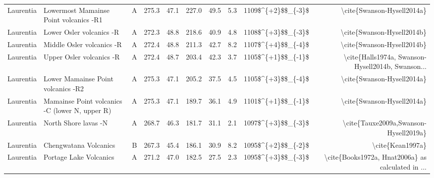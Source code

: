 \begin{longtable}{p{1 in}p{1 in}rrrrrrrr}
                     Laurentia &           Lowermost Mamainse Point volcanics -R1 &      A &     275.3 &      47.1 & 227.0 &  49.5 &       5.3 &     1109\$\textasciicircum \{+2\}\$\$\_\{-3\}\$ &                         \textbackslash cite\{Swanson-Hysell2014a\} \\
                     Laurentia &                         Lower Osler volcanics -R &      A &     272.3 &      48.8 & 218.6 &  40.9 &       4.8 &     1108\$\textasciicircum \{+3\}\$\$\_\{-3\}\$ &                         \textbackslash cite\{Swanson-Hysell2014b\} \\
                     Laurentia &                        Middle Osler volcanics -R &      A &     272.4 &      48.8 & 211.3 &  42.7 &       8.2 &     1107\$\textasciicircum \{+4\}\$\$\_\{-4\}\$ &                         \textbackslash cite\{Swanson-Hysell2014b\} \\
                     Laurentia &                         Upper Osler volcanics -R &      A &     272.4 &      48.7 & 203.4 &  42.3 &       3.7 &     1105\$\textasciicircum \{+1\}\$\$\_\{-1\}\$ &  \textbackslash cite\{Halls1974a, Swanson-Hysell2014b, Swanson... \\
                     Laurentia &               Lower Mamainse Point volcanics -R2 &      A &     275.3 &      47.1 & 205.2 &  37.5 &       4.5 &     1105\$\textasciicircum \{+3\}\$\$\_\{-4\}\$ &                         \textbackslash cite\{Swanson-Hysell2014a\} \\
                     Laurentia &   Mamainse Point volcanics -C (lower N, upper R) &      A &     275.3 &      47.1 & 189.7 &  36.1 &       4.9 &     1101\$\textasciicircum \{+1\}\$\$\_\{-1\}\$ &                         \textbackslash cite\{Swanson-Hysell2014a\} \\
                     Laurentia &                             North Shore lavas -N &      A &     268.7 &      46.3 & 181.7 &  31.1 &       2.1 &     1097\$\textasciicircum \{+3\}\$\$\_\{-3\}\$ &              \textbackslash cite\{Tauxe2009a,Swanson-Hysell2019a\} \\
                     Laurentia &                            Chengwatana Volcanics &      B &     267.3 &      45.4 & 186.1 &  30.9 &       8.2 &     1095\$\textasciicircum \{+2\}\$\$\_\{-2\}\$ &                                   \textbackslash cite\{Kean1997a\} \\
                     Laurentia &                           Portage Lake Volcanics &      A &     271.2 &      47.0 & 182.5 &  27.5 &       2.3 &     1095\$\textasciicircum \{+3\}\$\$\_\{-3\}\$ &  \textbackslash cite\{Books1972a, Hnat2006a\} as calculated in ... \\

\end{longtable}
